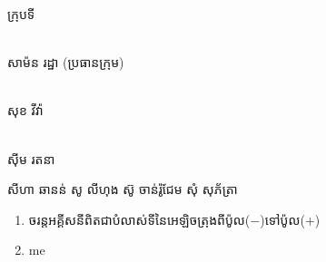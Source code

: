 \documentclass[15pt,a4paper]{article}
\author{james1}
\date{\today}
\newenvironment{kfont}{\khfont}{\par}
\begin{document}
\hfill\begin{minipage}
\begin{kfont}ក្រុបទី\end{kfont} 2\\
\begin{kfont}សាម៉ន រដ្ឋា (ប្រធានក្រុម)\end{kfont}\\
\begin{kfont}សុខ វីវ៉ា\end{kfont}\\
\begin{kfont}សុីម រតនា\end{kfont}
សីហា ឆានន់ 
សូ លីហុង
 ស៊ូ ចាន់រ៉ូជែម
សុំ សុភ័ត្រា
\end{minipage}
\begin{enumerate}
\item 
\begin{kfont}
ចរន្តអគ្គីសនីពិតជាបំលាស់ទីនៃអេឡិចត្រុងពីប៉ូល(\(-\))ទៅប៉ូល(\(+\))
\end{kfont}
\item 
me
\end{enumerate}
\end{document}
